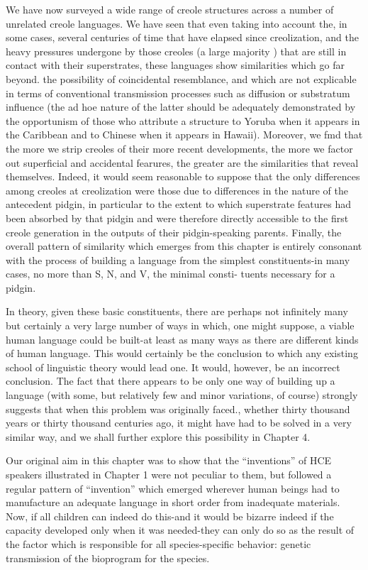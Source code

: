 We have now surveyed a wide range of creole structures across a number of unrelated creole languages. We have seen that even taking into account the, in some cases, several centuries of time that have elapsed since creolization, and the heavy pressures undergone by those creoles (a large majority ) that are still in contact with their superstrates, these languages show similarities which go far beyond. the possibility of coincidental resemblance, and which are not explicable in terms of conventional transmission processes such as diffusion or substratum influence (the ad hoe nature of the latter should be ade\-quately demonstrated by the opportunism of those who attribute a structure to Yoruba when it appears in the Caribbean and to Chinese when it appears in Hawaii). Moreover, we fmd that the more we strip creoles of their more recent developments, the more we factor out superficial and accidental fearures, the greater are the similarities that reveal themselves. Indeed, it would seem reasonable to suppose that the only differences among creoles at creolization were those due to differences in the nature of the antecedent pidgin, in particular to the extent to which superstrate features had been absorbed by that pidgin and were therefore directly accessible to the first creole generation in the outputs of their pidgin-speaking parents. Finally, the overall pattern of similarity which emerges from this chapter is entirely conso\-nant with the process of building a language from the simplest consti\-tuents-in many cases, no more than S, N, and V, the minimal consti{}- tuents necessary for a pidgin. 

In theory, given these basic constituents, there are perhaps not infinitely many but certainly a very large number of ways in which, one might suppose, a viable human language could be built-at least as many ways as there are different kinds of human language. This would certainly be the conclusion to which any existing school of linguistic theory would lead one. It would, however, be an incorrect conclusion. The fact that there appears to be only one way of building up a language (with some, but relatively few and minor variations, of course) strongly suggests that when this problem was originally faced., whether thirty thousand years or thirty thousand centuries ago, it might have had to be solved in a very similar way, and we shall further explore this possibility in Chapter 4.

Our original aim in this chapter was to show that the ``inven\-tions'' of HCE speakers illustrated in Chapter 1 were not peculiar to them, but followed a regular pattern of ``invention'' which emerged wherever human beings had to manufacture an adequate language in short order from inadequate materials. Now, if all children can indeed do this-and it would be bizarre indeed if the capacity developed only when it was needed-they can only do so as the result of the factor which is responsible for all species-specific behavior: genetic trans\-mission of the bioprogram for the species.

